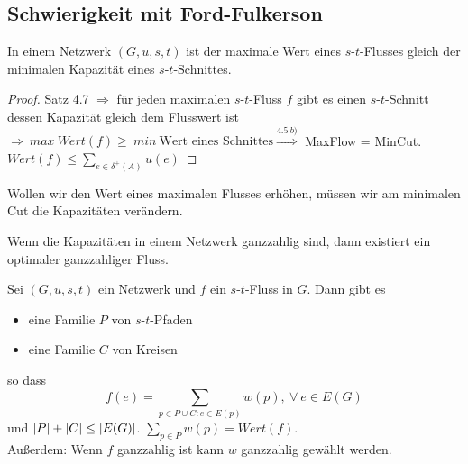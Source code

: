 \subsection{Schwierigkeit mit Ford-Fulkerson}
\begin{satz}
	In einem Netzwerk $(G, u, s, t)$ ist der maximale Wert eines $s$-$t$-Flusses gleich der minimalen Kapazität eines $s$-$t$-Schnittes.
\end{satz}
\begin{proof}
	Satz 4.7 $\Rightarrow$ für jeden maximalen $s$-$t$-Fluss $f$ gibt es einen $s$-$t$-Schnitt dessen Kapazität gleich dem Flusswert ist $\Rightarrow~max~Wert(f) \ge~min~\text{Wert eines Schnittes} \overset{4.5~b)}{\Rightarrow}$ MaxFlow = MinCut. $Wert(f) \le \sum_{e\in \delta^+(A)}u(e)$
\end{proof}
\begin{beobachtung*}
	Wollen wir den Wert eines maximalen Flusses erhöhen, müssen wir am minimalen Cut die Kapazitäten verändern.
\end{beobachtung*}
\begin{korollar}
	Wenn die Kapazitäten in einem Netzwerk ganzzahlig sind, dann existiert ein optimaler ganzzahliger Fluss.
\end{korollar}
\begin{satz}
	Sei $(G, u, s, t)$ ein Netzwerk und $f$ ein $s$-$t$-Fluss in $G$. Dann gibt es
	\begin{itemize}
		\item eine Familie $P$ von $s$-$t$-Pfaden
		\item eine Familie $C$ von Kreisen
	\end{itemize}
	so dass \[f(e) = \sum_{p\in P \cup C: e \in E(p)}w(p), ~\forall~e\in E(G)\] und $\vert P \vert + \vert C \vert\le \vert E(G) \vert$. $\sum_{p\in P} w(p) = Wert(f)$. \\[5pt]
	Außerdem: Wenn $f$ ganzzahlig ist kann $w$ ganzzahlig gewählt werden.
\end{satz}

